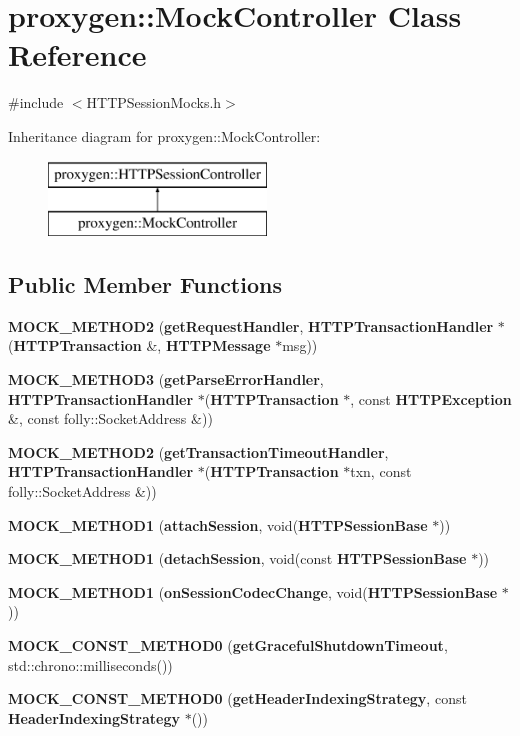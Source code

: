 \section{proxygen\+:\+:Mock\+Controller Class Reference}
\label{classproxygen_1_1MockController}


{\ttfamily \#include $<$H\+T\+T\+P\+Session\+Mocks.\+h$>$}

Inheritance diagram for proxygen\+:\+:Mock\+Controller\+:\begin{figure}[H]
\begin{center}
\leavevmode
\includegraphics[height=2.000000cm]{classproxygen_1_1MockController}
\end{center}
\end{figure}
\subsection*{Public Member Functions}
\begin{DoxyCompactItemize}
\item 
{\bf M\+O\+C\+K\+\_\+\+M\+E\+T\+H\+O\+D2} ({\bf get\+Request\+Handler}, {\bf H\+T\+T\+P\+Transaction\+Handler} $\ast$({\bf H\+T\+T\+P\+Transaction} \&, {\bf H\+T\+T\+P\+Message} $\ast$msg))
\item 
{\bf M\+O\+C\+K\+\_\+\+M\+E\+T\+H\+O\+D3} ({\bf get\+Parse\+Error\+Handler}, {\bf H\+T\+T\+P\+Transaction\+Handler} $\ast$({\bf H\+T\+T\+P\+Transaction} $\ast$, const {\bf H\+T\+T\+P\+Exception} \&, const folly\+::\+Socket\+Address \&))
\item 
{\bf M\+O\+C\+K\+\_\+\+M\+E\+T\+H\+O\+D2} ({\bf get\+Transaction\+Timeout\+Handler}, {\bf H\+T\+T\+P\+Transaction\+Handler} $\ast$({\bf H\+T\+T\+P\+Transaction} $\ast$txn, const folly\+::\+Socket\+Address \&))
\item 
{\bf M\+O\+C\+K\+\_\+\+M\+E\+T\+H\+O\+D1} ({\bf attach\+Session}, void({\bf H\+T\+T\+P\+Session\+Base} $\ast$))
\item 
{\bf M\+O\+C\+K\+\_\+\+M\+E\+T\+H\+O\+D1} ({\bf detach\+Session}, void(const {\bf H\+T\+T\+P\+Session\+Base} $\ast$))
\item 
{\bf M\+O\+C\+K\+\_\+\+M\+E\+T\+H\+O\+D1} ({\bf on\+Session\+Codec\+Change}, void({\bf H\+T\+T\+P\+Session\+Base} $\ast$))
\item 
{\bf M\+O\+C\+K\+\_\+\+C\+O\+N\+S\+T\+\_\+\+M\+E\+T\+H\+O\+D0} ({\bf get\+Graceful\+Shutdown\+Timeout}, std\+::chrono\+::milliseconds())
\item 
{\bf M\+O\+C\+K\+\_\+\+C\+O\+N\+S\+T\+\_\+\+M\+E\+T\+H\+O\+D0} ({\bf get\+Header\+Indexing\+Strategy}, const {\bf Header\+Indexing\+Strategy} $\ast$())
\end{DoxyCompactItemize}


